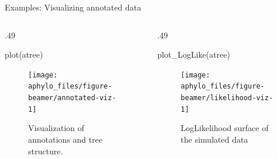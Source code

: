 \documentclass[9pt,handout,ignorenonframetext,]{beamer}
\newenvironment{Shaded}{\begin{snugshade}}{\end{snugshade}}
\newcommand{\KeywordTok}[1]{\textcolor[rgb]{0.94,0.87,0.69}{#1}}
\newcommand{\NormalTok}[1]{\textcolor[rgb]{0.80,0.80,0.80}{#1}}
\def\begincols{\begin{columns}[T]}
\def\begincol{\begin{column}[T]}
\def\endcol{\end{column}}
\def\endcols{\end{columns}}
\begin{document}
\begin{frame}[fragile,c]{Examples: Visualizing annotated data}

\begincols

\begincol{.49\textwidth}

\footnotesize

\begin{Shaded}
\begin{Highlighting}[]
\KeywordTok{plot}\NormalTok{(atree)}
\end{Highlighting}
\end{Shaded}

\begin{figure}

{\centering \texttt{[image: aphylo\_files/figure-beamer/annotated-viz-1]} 

}

\caption{Visualization of annotations and tree structure.}\label{fig:annotated-viz}
\end{figure}

\normalsize

\endcol

\begincol{.49\textwidth}

\footnotesize

\begin{Shaded}
\begin{Highlighting}[]
\KeywordTok{plot_LogLike}\NormalTok{(atree)}
\end{Highlighting}
\end{Shaded}

\begin{figure}

{\centering \texttt{[image: aphylo\_files/figure-beamer/likelihood-viz-1]} 

}

\caption{LogLikelihood surface of the simulated data}\label{fig:likelihood-viz}
\end{figure}

\normalsize

\endcol

\endcols

\end{frame}
\end{document}
